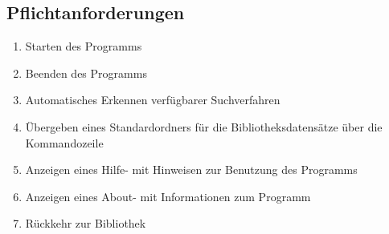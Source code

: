 \subsection{Pflichtanforderungen}
\begin{enumerate} [label=\bfseries /F \arabic*0/, leftmargin=*]
	\item Starten des Programms \label{f:programmstart}
	\item Beenden des Programms \label{f:beenden}
	\item Automatisches Erkennen verfügbarer Suchverfahren \label{f:erkennen_suchverfahren}
	\item Übergeben eines Standardordners für die Bibliotheksdatensätze über die Kommandozeile \label{f:standardordner_übergeben}
	\item Anzeigen eines Hilfe- mit Hinweisen zur Benutzung des Programms \label{f:hilfe}
	\item Anzeigen eines About- mit Informationen zum Programm \label{f:about}
	\item Rückkehr zur Bibliothek \label{f:rückkehr_zu_bibliothek}
	\newline
 

\end{enumerate}
